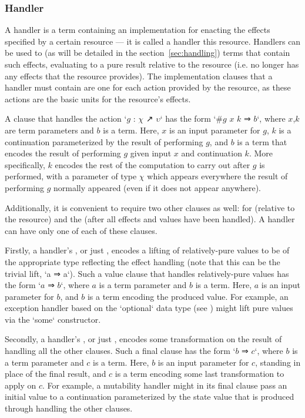 \subsubsection{Handler}

A handler is a term containing an implementation for enacting the effects specified by a certain resource --- it is called a handler  this resource.
Handlers can be used to  (as will be detailed in the section~\ref{sec:handling}) terms that contain such effects, evaluating to a pure result relative to the resource (i.e. no longer has any effects that the resource provides).
The implementation clauses that a handler must contain are one for each action provided by the resource, as these actions are the basic units for the resource's effects.

A clause that handles the action \code`$g$ : $χ$ ↗ $υ$` has the form
\code`#$g$ $x$ $k$ ⇒ $b$`,
where $x$,$k$ are term parameters and $b$ is a term.
Here,
$x$ is an input parameter for $g$,
$k$ is a continuation parameterized by the result of performing $g$, and
$b$ is a term that encodes the result of performing $g$ given input $x$ and continuation $k$.
More specifically, $k$ encodes the rest of the computation to carry out after $g$ is performed, with a parameter of type $χ$ which appears everywhere the result of performing $g$ normally appeared (even if it does not appear anywhere).

Additionally, it is convenient to require two other clauses as well: for  (relative to the resource) and the  (after all effects and values have been handled).
A handler can have only one of each of these clauses.

Firstly, a handler's , or just , encodes a lifting of relatively-pure values to be of the appropriate type reflecting the effect handling (note that this can be the trivial lift, \code`a ⇒ a`).
Such a value clause that handles relatively-pure values has the form
\code`$a$ ⇒ $b$`,
where $a$ is a term parameter and $b$ is a term.
Here,
$a$ is an input parameter for $b$, and
$b$ is a term encoding the produced value.
For example, an exception handler based on the \code`optional` data type (see \prelude{\LangA}) might lift pure values via the \code`some` constructor.

Secondly, a handler's , or just , encodes some transformation on the result of handling all the other clauses.
Such a final clause has the form
\code`$b$ ⇒ $c$`,
where $b$ is a term parameter and $c$ is a term.
Here,
$b$ is an input parameter for $c$, standing in place of the final result, and
$c$ is a term encoding some last transformation to apply on $c$.
For example, a mutability handler might in its final clause pass an initial value to a continuation parameterized by the state value that is produced through handling the other clauses.


